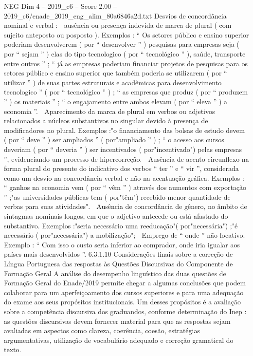 \begin{textsample}{NEG Dim 4 – 2019\_c6 – Score 2.00 – 2019\_c6/enade\_2019\_eng\_alim\_80a6846a2d.txt}
Desvios de concordância nominal e verbal :  ausência ou presença indevida de marca de plural ( com sujeito anteposto ou posposto ).
Exemplos : “ Os setores público e ensino superior poderiam desenvolverem ( por “ desenvolver ” ) pesquisas para empresas seja ( por “ sejam ” ) elas do tipo tecnologico ( por “ tecnológico ” ), saúde, transporte entre outros ” ; “ já as empresas poderiam financiar projetos de pesquisas para os setores público e ensino superior que também poderia se utilizarem ( por “ utilizar ” ) de suas partes estruturais e acadêmicas para desenvolvimento tecnologico ” ( por “ tecnológico ” ) ; “ as empresas que produz ( por “ produzem ” ) os materiais ” ; “ o engajamento entre ambos elevam ( por “ eleva ” ) a economia ”.  Aparecimento da marca de plural em verbos ou adjetivos relacionados a núcleos substantivos no singular devido à presença de modificadores no plural.
Exemplos :"o financiamento das bolsas de estudo devem ( por “ deve ” ) ser ampliados ” ( por"ampliado ” ) ; “ o acesso aos cursos deveriam ( por “ deveria ” ) ser incentivados ( por"incentivado") pelas empresas ”, evidenciando um processo de hipercorreção.  Ausência de acento circunflexo na forma plural do presente do indicativo dos verbos “ ter ” e “ vir ”, considerada como um desvio na concordância verbal e não na acentuação gráfica.
Exemplos : “ ganhos na economia vem ( por “ vêm ” ) através dos aumentos com exportação ” ;"as universidades públicas tem ( por"têm") recebido menor quantidade de verbas para suas atividades".  Ausência de concordância de gênero, no âmbito de sintagmas nominais longos, em que o adjetivo antecede ou está afastado do substantivo.
Exemplos :"seria necessário uma reeducação"( por"necessária") ;"é necessário ( por"necessária") a mobilização";  Emprego de “ onde ” não locativo.
Exemplo : “ Com isso o custo seria inferior ao comprador, onde iria igualar aos países mais desenvolvidos ”. 6.3.1.10 Considerações finais sobre a correção de Língua Portuguesa das respostas às Questões Discursivas do Componente de Formação Geral A análise do desempenho linguístico das duas questões de Formação Geral do Enade/2019 permite chegar a algumas conclusões que podem colaborar para um aperfeiçoamento dos cursos superiores e para uma adequação do exame aos seus propósitos institucionais.
Um desses propósitos é a avaliação sobre a competência discursiva dos graduandos, conforme determinação do Inep : as questões discursivas devem fornecer material para que as respostas sejam avaliadas em aspectos como clareza, coerência, coesão, estratégias argumentativas, utilização de vocabulário adequado e correção gramatical do texto.

\end{textsample}
